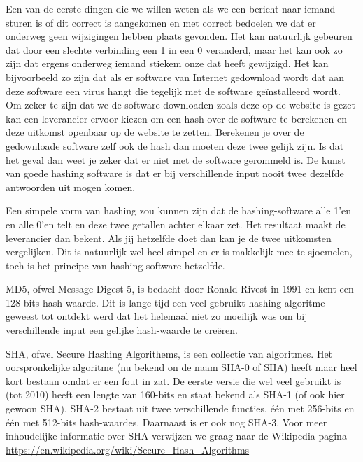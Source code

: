 Een van de eerste dingen die we willen weten als we een bericht naar iemand sturen is of dit correct is aangekomen en met correct bedoelen we dat er onderweg geen wijzigingen hebben plaats gevonden. Het kan natuurlijk gebeuren dat door een slechte verbinding een 1 in een 0 veranderd, maar het kan ook zo zijn dat ergens onderweg iemand stiekem onze dat heeft gewijzigd. Het kan bijvoorbeeld zo zijn dat als er software van Internet gedownload wordt dat aan deze software een virus hangt die tegelijk met de software ge\"installeerd wordt. Om zeker te zijn dat we de software downloaden zoals deze op de website is gezet kan een leverancier ervoor kiezen om een hash over de software te berekenen en deze uitkomst openbaar op de website te zetten. Berekenen je over de gedownloade software zelf ook de hash dan moeten deze twee gelijk zijn. Is dat het geval dan weet je zeker dat er niet met de software gerommeld is. De kunst van goede hashing software is dat er bij verschillende input nooit twee dezelfde antwoorden uit mogen komen.

Een simpele vorm van hashing zou kunnen zijn dat de hashing-software alle 1'en en alle 0'en telt en deze twee getallen achter elkaar zet. Het resultaat maakt de leverancier dan bekent. Als jij hetzelfde doet dan kan je de twee uitkomsten vergelijken. Dit is natuurlijk wel heel simpel en er is makkelijk mee te sjoemelen, toch is het principe van hashing-software hetzelfde.

MD5, ofwel Message-Digest 5, is bedacht door Ronald Rivest in 1991 en kent een 128 bits hash-waarde. Dit is lange tijd een veel gebruikt hashing-algoritme geweest tot ontdekt werd dat het helemaal niet zo moeilijk was om bij verschillende input een gelijke hash-waarde te cre\"eren.

SHA, ofwel Secure Hashing Algorithems, is een collectie van algoritmes. Het oorspronkelijke algoritme (nu bekend on de naam SHA-0 of SHA) heeft maar heel kort bestaan omdat er een fout in zat. De eerste versie die wel veel gebruikt is (tot 2010) heeft een lengte van 160-bits en staat bekend als SHA-1 (of ook hier gewoon SHA). SHA-2 bestaat uit twee verschillende functies, \'e\'en met 256-bits en \'e\'en met 512-bits hash-waardes. Daarnaast is er ook nog SHA-3. Voor meer inhoudelijke informatie over SHA verwijzen we graag naar de Wikipedia-pagina \url{https://en.wikipedia.org/wiki/Secure\_Hash\_Algorithms}

